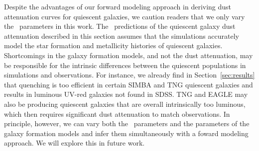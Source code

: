 Despite the advantages of our forward modeling approach in deriving dust
attenuation curves for quiescent galaxies, we caution readers
that we only vary the \eda~parameters in this work.     
The \eda~predictions of the quiescent galaxy dust attenuation described in this
section assumes that the simulations accurately model the star formation and
metallicity histories of quiescent galaxies. 
Shortcomings in the galaxy formation models, and not the dust attenuation, may
be responsible for the intrinsic differences between the quiescent populations
in simulations and observations. 
For instance, we already find in Section~\ref{sec:results} that quenching
is too efficient in certain SIMBA and TNG quiescent galaxies and results
in luminous UV-red galaxies not found in SDSS. %
TNG and EAGLE may also be producing quiescent galaxies that are
overall intrinsically too luminous, which then requires significant dust
attenuation to match observations.
In principle, however, we can vary both the \eda~parameters and the parameters
of the galaxy formation models and infer them simultaneously with a foward
modeling approach. 
We will explore this in future work. 
